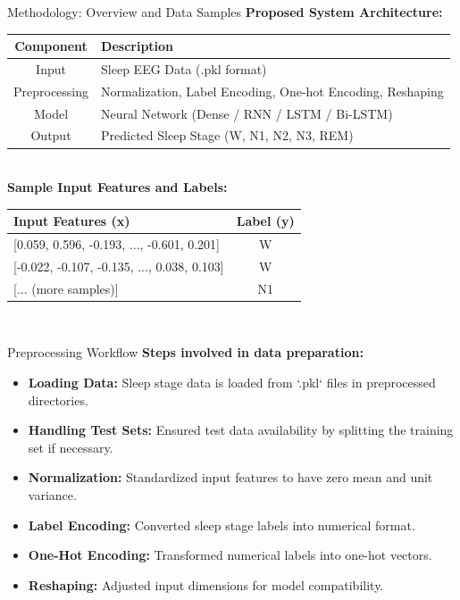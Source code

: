 \begin{frame}{Methodology: Overview and Data Samples}
		\centering
	\small
	\textbf{Proposed System Architecture:} \\[5pt]

	\begin{tabular}{|c|p{}|}
		\hline
		\textbf{Component} & \textbf{Description} \\
		\hline
		Input & Sleep EEG Data (.pkl format) \\
		\hline
		Preprocessing & Normalization, Label Encoding, One-hot Encoding, Reshaping \\
		\hline
		Model & Neural Network (Dense / RNN / LSTM / Bi-LSTM) \\
		\hline
		Output & Predicted Sleep Stage (W, N1, N2, N3, REM) \\
		\hline
	\end{tabular} \\[10pt]
	
	\textbf{Sample Input Features and Labels:} \\[5pt]
	\centering
	\begin{tabular}{|p{}|c|}
		\hline
		\textbf{Input Features (x)} & \textbf{Label (y)} \\
		\hline
		{[0.059, 0.596, -0.193, ..., -0.601, 0.201]} & W \\
		\hline
		{[-0.022, -0.107, -0.135, ..., 0.038, 0.103]} & W \\
		\hline
		{[... (more samples)]} & N1 \\
		\hline
	\end{tabular} \\[5pt]
	
 
	
\end{frame}


 
 
 






\begin{frame}{Preprocessing Workflow}
	\textbf{Steps involved in data preparation:} \\[10pt]
	\begin{itemize}
		\item \textbf{Loading Data:} Sleep stage data is loaded from `.pkl` files in preprocessed directories.
		\item \textbf{Handling Test Sets:} Ensured test data availability by splitting the training set if necessary.
		\item \textbf{Normalization:} Standardized input features to have zero mean and unit variance.
		\item \textbf{Label Encoding:} Converted sleep stage labels into numerical format.
		\item \textbf{One-Hot Encoding:} Transformed numerical labels into one-hot vectors.
		\item \textbf{Reshaping:} Adjusted input dimensions for model compatibility.
	\end{itemize}
\end{frame}


